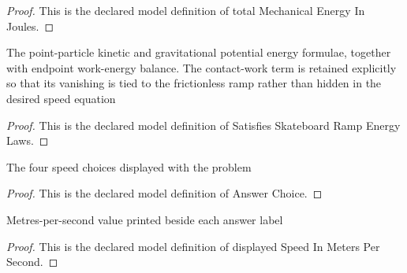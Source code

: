 \begin{proof}
  This is the declared model definition of total Mechanical Energy In Joules.
\end{proof}
\begin{definition}
  \label{def:physics:phyx-mini-0811:phyxminiproblems-problemphyxmini0811-satisfiesskateboardrampenergylaws}
  The point-particle kinetic and gravitational potential energy formulae, together with endpoint work-energy balance. The contact-work term is retained explicitly so that its vanishing is tied to the frictionless ramp rather than hidden in the desired speed equation
\end{definition}
\begin{proof}
  This is the declared model definition of Satisfies Skateboard Ramp Energy Laws.
\end{proof}
\begin{definition}
  \label{def:physics:phyx-mini-0811:phyxminiproblems-problemphyxmini0811-answerchoice}
  The four speed choices displayed with the problem
\end{definition}
\begin{proof}
  This is the declared model definition of Answer Choice.
\end{proof}
\begin{definition}
  \label{def:physics:phyx-mini-0811:phyxminiproblems-problemphyxmini0811-displayedspeedinmeterspersecond}
  Metres-per-second value printed beside each answer label
\end{definition}
\begin{proof}
  This is the declared model definition of displayed Speed In Meters Per Second.
\end{proof}
